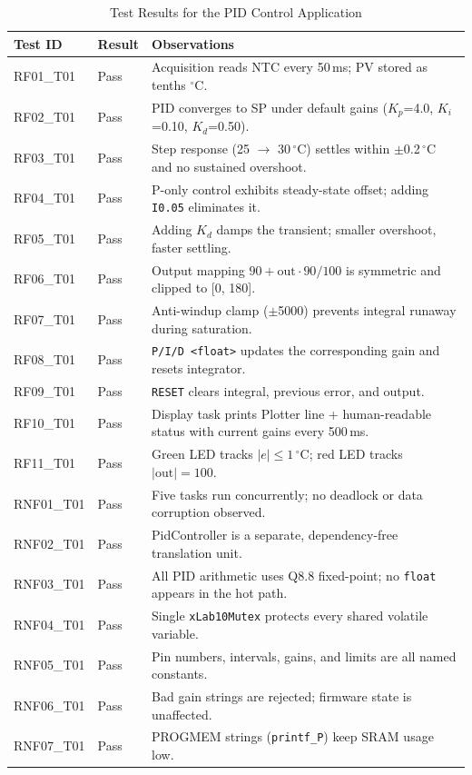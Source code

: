 \documentclass[12pt]{article}
\begin{document}
\begin{table}[H]
\centering
\begin{tabular}{@{}llp{7.5cm}@{}}
\toprule
\textbf{Test ID} & \textbf{Result} & \textbf{Observations} \\
\midrule
RF01\_T01  & Pass & Acquisition reads NTC every 50\,ms; PV stored as tenths $^{\circ}$C. \\
RF02\_T01  & Pass & PID converges to SP under default gains ($K_p$=4.0, $K_i$=0.10, $K_d$=0.50). \\
RF03\_T01  & Pass & Step response (25 $\to$ 30\,$^{\circ}$C) settles within $\pm$0.2\,$^{\circ}$C and no sustained overshoot. \\
RF04\_T01  & Pass & P-only control exhibits steady-state offset; adding \texttt{I0.05} eliminates it. \\
RF05\_T01  & Pass & Adding $K_d$ damps the transient; smaller overshoot, faster settling. \\
RF06\_T01  & Pass & Output mapping $90 + \mathrm{out} \cdot 90/100$ is symmetric and clipped to [0, 180]. \\
RF07\_T01  & Pass & Anti-windup clamp ($\pm$5000) prevents integral runaway during saturation. \\
RF08\_T01  & Pass & \texttt{P/I/D <float>} updates the corresponding gain and resets integrator. \\
RF09\_T01  & Pass & \texttt{RESET} clears integral, previous error, and output. \\
RF10\_T01  & Pass & Display task prints Plotter line + human-readable status with current gains every 500\,ms. \\
RF11\_T01  & Pass & Green LED tracks $|e| \le 1$\,$^{\circ}$C; red LED tracks $|\mathrm{out}|=100$. \\
RNF01\_T01 & Pass & Five tasks run concurrently; no deadlock or data corruption observed. \\
RNF02\_T01 & Pass & PidController is a separate, dependency-free translation unit. \\
RNF03\_T01 & Pass & All PID arithmetic uses Q8.8 fixed-point; no \texttt{float} appears in the hot path. \\
RNF04\_T01 & Pass & Single \texttt{xLab10Mutex} protects every shared volatile variable. \\
RNF05\_T01 & Pass & Pin numbers, intervals, gains, and limits are all named constants. \\
RNF06\_T01 & Pass & Bad gain strings are rejected; firmware state is unaffected. \\
RNF07\_T01 & Pass & PROGMEM strings (\texttt{printf\_P}) keep SRAM usage low. \\
\bottomrule
\end{tabular}
\caption{Test Results for the PID Control Application}
\label{tab:tests}
\end{table}
\end{document}

